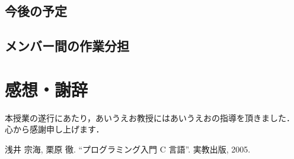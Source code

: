 \documentclass[a4j, titlepage]{jarticle}
\begin{document}
\subsection{今後の予定}

\subsection{メンバー間の作業分担}

\section{感想・謝辞}
本授業の遂行にあたり，あいうえお教授にはあいうえおの指導を頂きました．
心から感謝申し上げます．

\begin{thebibliography}{99}
 浅井 宗海, 栗原 徹. “プログラミング入門 C 言語”. 実教出版, 2005. %
\end{thebibliography}
\end{document}
